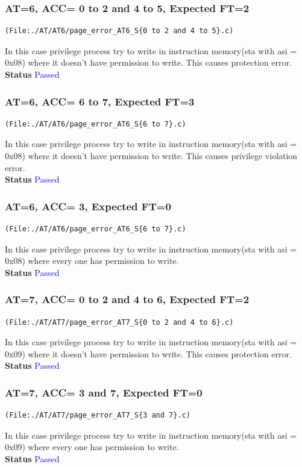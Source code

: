 \documentclass[12pt,a4paper]{article}
\begin{document}
\subsubsection{ AT=6, ACC= 0 to 2 and 4 to 5, Expected FT=2}
\begin{lstlisting}
(File:./AT/AT6/page_error_AT6_S{0 to 2 and 4 to 5}.c)
\end{lstlisting}
In this case privilege process try to write in instruction memory(sta with asi = 0x08) where it doesn't have permission to write. This causes protection error.\\
\textbf{Status} \textcolor{blue}{Passed}

\subsubsection{ AT=6, ACC= 6 to 7, Expected FT=3}
\begin{lstlisting}
(File:./AT/AT6/page_error_AT6_S{6 to 7}.c)
\end{lstlisting}
In this case privilege process try to write in instruction memory(sta with asi = 0x08) where it doesn't have permission to write. This causes privilege violation error.\\
\textbf{Status} \textcolor{blue}{Passed}


\subsubsection{ AT=6, ACC= 3, Expected FT=0}
\begin{lstlisting}
(File:./AT/AT6/page_error_AT6_S{6 to 7}.c)
\end{lstlisting}
In this case privilege process try to write in instruction memory(sta with asi = 0x08) where every one has permission to write. \\
\textbf{Status} \textcolor{blue}{Passed}
\subsubsection{ AT=7, ACC= 0 to 2 and 4 to 6, Expected FT=2}
\begin{lstlisting}
(File:./AT/AT7/page_error_AT7_S{0 to 2 and 4 to 6}.c)
\end{lstlisting}
In this case privilege process try to write in instruction memory(sta with asi = 0x09) where it doesn't have permission to write. This causes protection error.\\
\textbf{Status} \textcolor{blue}{Passed}

\subsubsection{ AT=7, ACC= 3 and 7, Expected FT=0}
\begin{lstlisting}
(File:./AT/AT7/page_error_AT7_S{3 and 7}.c)
\end{lstlisting}
In this case privilege process try to write in instruction memory(sta with asi = 0x09) where every one has permission to write.\\
\textbf{Status} \textcolor{blue}{Passed}
\end{document}
